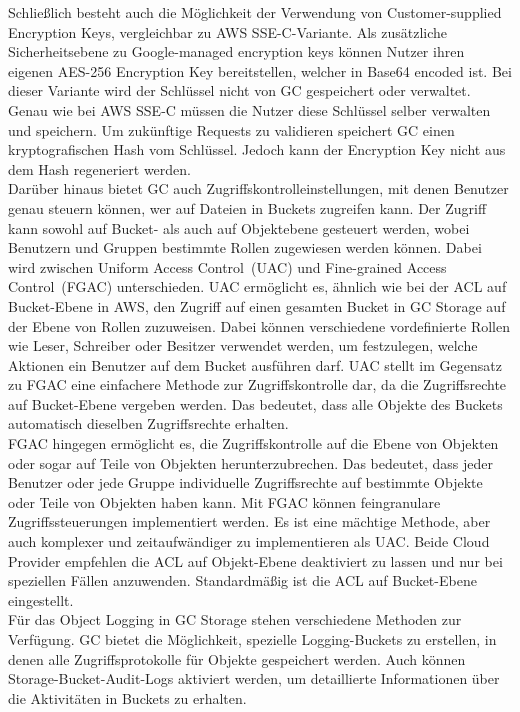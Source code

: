 Schließlich besteht auch die Möglichkeit der Verwendung von Customer-supplied Encryption Keys, vergleichbar zu AWS SSE-C-Variante. Als zusätzliche Sicherheitsebene zu Google-managed encryption keys können Nutzer ihren eigenen AES-256 Encryption Key bereitstellen, welcher in Base64 encoded ist. Bei dieser Variante wird der Schlüssel nicht von GC gespeichert oder verwaltet. Genau wie bei AWS SSE-C müssen die Nutzer diese Schlüssel selber verwalten und speichern. Um zukünftige Requests zu validieren speichert GC einen kryptografischen Hash vom Schlüssel. Jedoch kann der Encryption Key nicht aus dem Hash regeneriert werden.\\

Darüber hinaus bietet GC auch Zugriffskontrolleinstellungen, mit denen Benutzer genau steuern können, wer auf Dateien in Buckets zugreifen kann. Der Zugriff kann sowohl auf Bucket- als auch auf Objektebene gesteuert werden, wobei Benutzern und Gruppen bestimmte Rollen zugewiesen werden können. Dabei wird zwischen \glqq Uniform Access Control\grqq\ (UAC) und \glqq Fine-grained Access Control\grqq\ (FGAC) unterschieden. UAC ermöglicht es, ähnlich wie bei der ACL auf Bucket-Ebene in AWS, den Zugriff auf einen gesamten Bucket in GC Storage auf der Ebene von Rollen zuzuweisen. Dabei können verschiedene vordefinierte Rollen wie Leser, Schreiber oder Besitzer verwendet werden, um festzulegen, welche Aktionen ein Benutzer auf dem Bucket ausführen darf. UAC stellt im Gegensatz zu FGAC eine einfachere Methode zur Zugriffskontrolle dar, da die Zugriffsrechte auf Bucket-Ebene vergeben werden. Das bedeutet, dass alle Objekte des Buckets automatisch dieselben Zugriffsrechte erhalten.\\

FGAC hingegen ermöglicht es, die Zugriffskontrolle auf die Ebene von Objekten oder sogar auf Teile von Objekten herunterzubrechen. Das bedeutet, dass jeder Benutzer oder jede Gruppe individuelle Zugriffsrechte auf bestimmte Objekte oder Teile von Objekten haben kann. Mit FGAC können feingranulare Zugriffssteuerungen implementiert werden. Es ist eine mächtige Methode, aber auch komplexer und zeitaufwändiger zu implementieren als UAC. Beide Cloud Provider empfehlen die ACL auf Objekt-Ebene deaktiviert zu lassen und nur bei speziellen Fällen anzuwenden. Standardmäßig ist die ACL auf Bucket-Ebene eingestellt.\\

Für das Object Logging in GC Storage stehen verschiedene Methoden zur Verfügung. GC bietet die Möglichkeit, spezielle Logging-Buckets zu erstellen, in denen alle Zugriffsprotokolle für Objekte gespeichert werden. Auch können Storage-Bucket-Audit-Logs aktiviert werden, um detaillierte Informationen über die Aktivitäten in Buckets zu erhalten.

